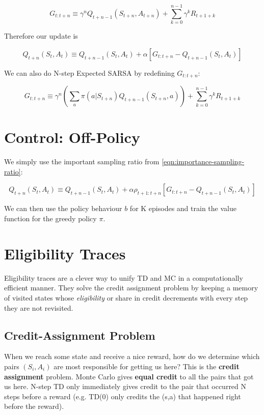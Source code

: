\documentclass[11pt]{report}
\begin{document}
\begin{equation}
	\label{eqn:n-step-sarsa-return}
	G_{t:t+n} \equiv \gamma^n Q_{t+n-1}(S_{t+n}, A_{t+n}) + \sum_{k=0}^{n-1} \gamma^{k}R_{t+1+k}
\end{equation}

Therefore our update is

\begin{equation}
	\label{eqn:n-step-sarsa-update}
	Q_{t+n}(S_t,A_t) \equiv Q_{t+n-1}(S_t,A_t) + \alpha[G_{t:t+n} - Q_{t+n-1}(S_t,A_t)]
\end{equation}

We can also do N-step Expected SARSA by redefining $G_{t:t+n}$:

\begin{equation}
	\label{eqn:n-step-expected-sarsa-return}
	G_{t:t+n} \equiv \gamma^n \left(\sum_{a}\pi(a|S_{t+n})Q_{t+n-1}(S_{t+n},a)\right) + \sum_{k=0}^{n-1} \gamma^{k}R_{t+1+k}
\end{equation}



\section{Control: Off-Policy}
We simply use the important sampling ratio from \autoref{eqn:importance-sampling-ratio}:


\begin{equation}
	\label{eqn:n-step-off-policy-update}
	Q_{t+n}(S_t,A_t) \equiv Q_{t+n-1}(S_t,A_t) + \alpha\rho_{t+1:t+n}[G_{t:t+n} - Q_{t+n-1}(S_t,A_t)]
\end{equation}

We can then use the policy behaviour $b$ for K episodes and train the value function for the greedy policy $\pi$.

\section{Eligibility Traces}

Eligibility traces are a clever way to unify TD and MC in a computationally efficient manner. They solve the credit assignment problem by keeping a memory of visited states whose \textit{eligibility} or share in credit decrements with every step they are not revisited.

\subsection{Credit-Assignment Problem}
When we reach some state and receive a nice reward, how do we determine which pairs $(S_i, A_i)$ are most responsible for getting us here? This is the \textbf{credit assignment} problem. Monte Carlo gives \textbf{equal credit} to all the pairs that got us here. N-step TD only immediately gives credit to the pair that occurred N steps before a reward (e.g. TD(0) only credits the (s,a) that happened right before the reward).
\end{document}
